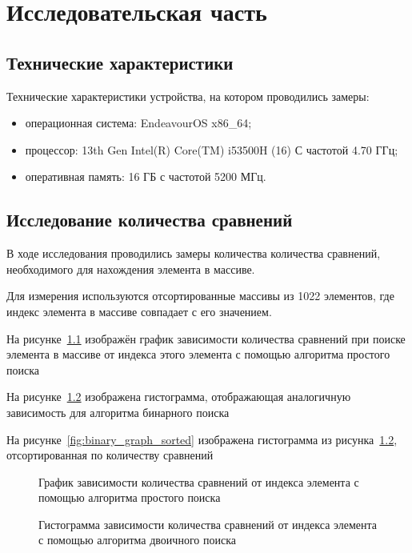 \chapter{Исследовательская часть}

\section{Технические характеристики}

Технические характеристики устройства, на котором проводились замеры:

\begin{itemize}
	\item операционная система: EndeavourOS x86\_64;
	\item процессор: 13th Gen Intel(R) Core(TM) i53500H (16) С частотой 4.70 ГГц;
	\item оперативная память: 16 ГБ с частотой 5200 МГц.
\end{itemize}

\section{Исследование количества сравнений}

В ходе исследования проводились замеры количества количества сравнений, необходимого для нахождения элемента в массиве.

Для измерения используются отсортированные массивы из 1022 элементов, где индекс элемента в массиве совпадает с его значением.

На рисунке~\ref{fig:simple_graph} изображён график зависимости количества сравнений при поиске элемента в массиве от индекса этого элемента с помощью алгоритма простого поиска

На рисунке~\ref{fig:binary_graph} изображена гистограмма, отображающая аналогичную зависимость для алгоритма бинарного поиска

На рисунке~\ref{fig:binary_graph_sorted} изображена гистограмма из рисунка~\ref{fig:binary_graph}, отсортированная по количеству сравнений

\begin{figure}[h!]
	
	\caption{График зависимости количества сравнений от индекса элемента с помощью алгоритма простого поиска}
	\label{fig:simple_graph}
\end{figure}

\begin{figure}[h!]
	
	\caption{Гистограмма зависимости количества сравнений от индекса элемента с помощью алгоритма двоичного поиска}
	\label{fig:binary_graph}
\end{figure}

